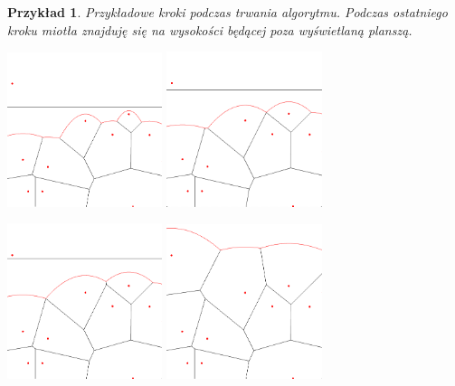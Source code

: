 \documentclass[declaration,shortabstract, inz]{iithesis}
\theoremstyle{definition} \newtheorem{definition}{Definicja}[]
\theoremstyle{plain} \newtheorem{remark}[definition]{Obserwacja}
\theoremstyle{plain} \newtheorem{theorem}[definition]{Twierdzenie}
\theoremstyle{plain} \newtheorem{example}{Przykład}[definition]
\theoremstyle{plain} \newtheorem{lemma}[definition]{Lemat}
\begin{document}
\begin{example}
Przykładowe kroki podczas trwania algorytmu. Podczas ostatniego kroku miotła znajduję się na wysokości będącej poza wyświetlaną planszą.

	\begin{center}
		\includegraphics[width=0.34\textwidth]{fortune2}
		\includegraphics[width=0.34\textwidth]{fortune3}
	\end{center}
	\begin{center}
		\includegraphics[width=0.34\textwidth]{fortune4}
		\includegraphics[width=0.34\textwidth]{fortune5}
	\end{center}
\end{example}
\end{document}

